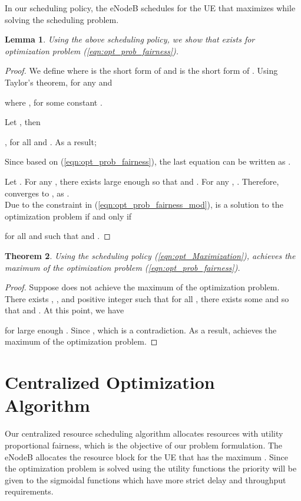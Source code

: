 \documentclass[conference]{IEEEtran}
\newtheorem{thm}{Theorem}[section]
\newtheorem{lem}[thm]{Lemma}
\begin{document}
In our scheduling policy, the eNodeB schedules for the UE that maximizes  while solving the scheduling problem.\\      

\begin{lem}\label{lem:optimality}  Using the above scheduling policy, we show that  exists for optimization problem (\ref{eqn:opt_prob_fairness}).
\end{lem}

\begin{proof}
We define  where  is the short form of  and  is the short form of . Using Taylor's theorem, for any  and 

 

where , for some constant . 

Let , then 

 
, for all  and . As a result;


Since  based on (\ref{eqn:opt_prob_fairness}), the last equation can be written as 
.

Let . For any , there exists large enough  so that  and . For any , . Therefore,  converges to , as . \\  
   
Due to the constraint  in (\ref{eqn:opt_prob_fairness_mod}),  is a solution to the optimization problem if and only if 


for all  and  such that  and .

\end{proof}

\begin{thm}\label{thm:limitmax}
Using the scheduling policy (\ref{eqn:opt_Maximization}),  achieves the maximum of the optimization problem (\ref{eqn:opt_prob_fairness}). 
\end{thm}
\begin{proof}
Suppose  does not achieve the maximum of the optimization problem. There exists , , and positive integer  such that for all , there exists some  and  so that  and  . At this point, we have 

for large enough . Since , which is a contradiction. As a result,  achieves the maximum of the optimization problem.
\end{proof}



\section{Centralized Optimization Algorithm}\label{sec:Algorithm}
Our centralized resource scheduling algorithm allocates resources with utility proportional fairness, which is the objective of our problem formulation. The eNodeB allocates the resource block  for the UE that has the maximum . Since the optimization problem is solved using the utility functions the priority will be given to the sigmoidal functions which have more strict delay and throughput requirements. 
\end{document}
